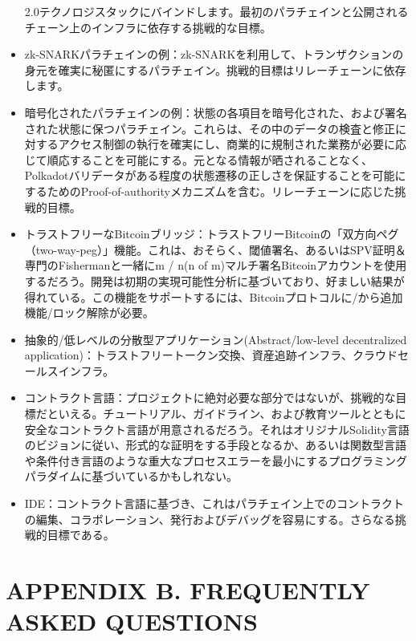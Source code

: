 \begin{itemize}
  2.0テクノロジスタックにバインドします。最初のパラチェインと公開されるチェーン上のインフラに依存する挑戦的な目標。
\item
  zk-SNARKパラチェインの例：zk-SNARKを利用して、トランザクションの身元を確実に秘匿にするパラチェイン。挑戦的目標はリレーチェーンに依存します。
\item
  暗号化されたパラチェインの例：状態の各項目を暗号化された、および署名された状態に保つパラチェイン。これらは、その中のデータの検査と修正に対するアクセス制御の執行を確実にし、商業的に規制された業務が必要に応じて順応することを可能にする。元となる情報が晒されることなく、Polkadotバリデータがある程度の状態遷移の正しさを保証することを可能にするためのProof-of-authorityメカニズムを含む。リレーチェーンに応じた挑戦的目標。
\item
  トラストフリーなBitcoinブリッジ：トラストフリーBitcoinの「双方向ペグ（two-way-peg）」機能。これは、おそらく、閾値署名、あるいはSPV証明＆専門のFishermanと一緒にm
  / n(n of
  m)マルチ署名Bitcoinアカウントを使用するだろう。開発は初期の実現可能性分析に基づいており、好ましい結果が得れている。この機能をサポートするには、Bitcoinプロトコルに/から追加機能/ロック解除が必要。
\item
  抽象的/低レベルの分散型アプリケーション(Abstract/low-level
  decentralized
  application)：トラストフリートークン交換、資産追跡インフラ、クラウドセールスインフラ。
\item
  コントラクト言語：プロジェクトに絶対必要な部分ではないが、挑戦的な目標だといえる。チュートリアル、ガイドライン、および教育ツールとともに安全なコントラクト言語が用意されるだろう。それはオリジナルSolidity言語のビジョンに従い、形式的な証明をする手段となるか、あるいは関数型言語や条件付き言語のような重大なプロセスエラーを最小にするプログラミングパラダイムに基づいているかもしれない。
\item
  IDE：コントラクト言語に基づき、これはパラチェイン上でのコントラクトの編集、コラボレーション、発行およびデバッグを容易にする。さらなる挑戦的目標である。
\end{itemize}

\hypertarget{appendix-b.-frequently-asked-questions}{%
\section{APPENDIX B. FREQUENTLY ASKED
QUESTIONS}\label{appendix-b.-frequently-asked-questions}}

